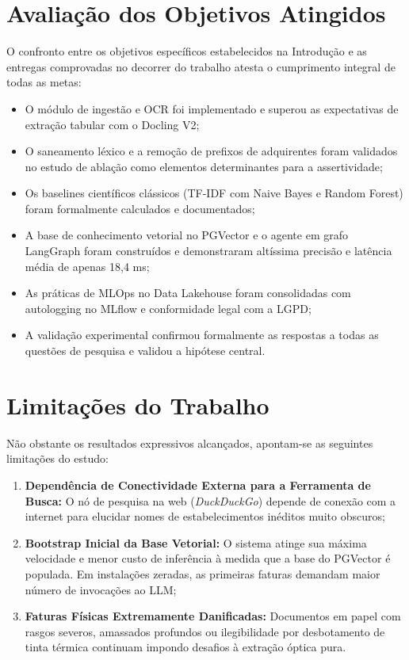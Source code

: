 \documentclass[
	12pt,				
	openright,			
	oneside,			
	a4paper,			
	english,			
	brazil				
	]{abntex2}
\begin{document}
\section{Avaliação dos Objetivos Atingidos}
\label{sec:concl_objetivos_atingidos}

O confronto entre os objetivos específicos estabelecidos na Introdução e as entregas comprovadas no decorrer do trabalho atesta o cumprimento integral de todas as metas:
\begin{itemize}
    \item O módulo de ingestão e OCR foi implementado e superou as expectativas de extração tabular com o Docling V2;
    \item O saneamento léxico e a remoção de prefixos de adquirentes foram validados no estudo de ablação como elementos determinantes para a assertividade;
    \item Os baselines científicos clássicos (TF-IDF com Naive Bayes e Random Forest) foram formalmente calculados e documentados;
    \item A base de conhecimento vetorial no PGVector e o agente em grafo LangGraph foram construídos e demonstraram altíssima precisão e latência média de apenas 18,4 ms;
    \item As práticas de MLOps no Data Lakehouse foram consolidadas com autologging no MLflow e conformidade legal com a LGPD;
    \item A validação experimental confirmou formalmente as respostas a todas as questões de pesquisa e validou a hipótese central.
\end{itemize}

\section{Limitações do Trabalho}
\label{sec:concl_limitacoes}

Não obstante os resultados expressivos alcançados, apontam-se as seguintes limitações do estudo:
\begin{enumerate}
    \item \textbf{Dependência de Conectividade Externa para a Ferramenta de Busca:} O nó de pesquisa na web (\textit{DuckDuckGo}) depende de conexão com a internet para elucidar nomes de estabelecimentos inéditos muito obscuros;
    \item \textbf{Bootstrap Inicial da Base Vetorial:} O sistema atinge sua máxima velocidade e menor custo de inferência à medida que a base do PGVector é populada. Em instalações zeradas, as primeiras faturas demandam maior número de invocações ao LLM;
    \item \textbf{Faturas Físicas Extremamente Danificadas:} Documentos em papel com rasgos severos, amassados profundos ou ilegibilidade por desbotamento de tinta térmica continuam impondo desafios à extração óptica pura.
\end{enumerate}
\end{document}
